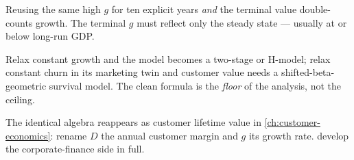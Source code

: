 \begin{trap}
Reusing the same high \(g\) for ten explicit years \emph{and} the terminal value
double-counts growth. The terminal \(g\) must reflect only the steady state ---
usually at or below long-run GDP.
\end{trap}

\begin{deeper}
Relax constant growth and the model becomes a two-stage or H-model; relax constant
churn in its marketing twin and customer value needs a shifted-beta-geometric survival
model. The clean formula is the \emph{floor} of the analysis, not the ceiling.
\end{deeper}

The identical algebra reappears as customer lifetime value in
\cref{ch:customer-economics}: rename \(D\) the annual customer margin and \(g\) its
growth rate. \textcite{brealey2020} develop the corporate-finance side in full.
